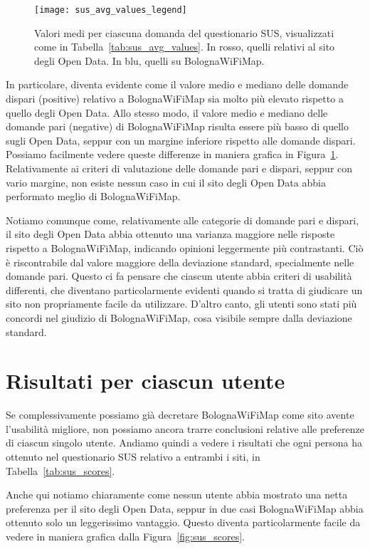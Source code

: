 \begin{figure}[H]
    \centering
    \texttt{[image: sus\_avg\_values\_legend]}
    \caption[Valori medi per ciascuna domanda del questionario SUS]{Valori medi per ciascuna domanda del questionario SUS, visualizzati come in Tabella~\ref{tab:sus_avg_values}. In rosso, quelli relativi al sito degli Open Data. In blu, quelli su BolognaWiFiMap.}
    \label{fig:sus_avg_values}
\end{figure}

In particolare, diventa evidente come il valore medio e mediano delle domande dispari (positive) relativo a BolognaWiFiMap sia molto più elevato rispetto a quello degli Open Data. Allo stesso modo, il valore medio e mediano delle domande pari (negative) di BolognaWiFiMap risulta essere più basso di quello sugli Open Data, seppur con un margine inferiore rispetto alle domande dispari. Possiamo facilmente vedere queste differenze in maniera grafica in Figura~\ref{fig:sus_avg_values}. Relativamente ai criteri di valutazione delle domande pari e dispari, seppur con vario margine, non esiste nessun caso in cui il sito degli Open Data abbia performato meglio di BolognaWiFiMap.

Notiamo comunque come, relativamente alle categorie di domande pari e dispari, il sito degli Open Data abbia ottenuto una varianza maggiore nelle risposte rispetto a BolognaWiFiMap, indicando opinioni leggermente più contrastanti. Ciò è riscontrabile dal valore maggiore della deviazione standard, specialmente nelle domande pari. Questo ci fa pensare che ciascun utente abbia criteri di usabilità differenti, che diventano particolarmente evidenti quando si tratta di giudicare un sito non propriamente facile da utilizzare. D'altro canto, gli utenti sono stati più concordi nel giudizio di BolognaWiFiMap, cosa visibile sempre dalla deviazione standard.

\section{Risultati per ciascun utente}
Se complessivamente possiamo già decretare BolognaWiFiMap come sito avente l'usabilità migliore, non possiamo ancora trarre conclusioni relative alle preferenze di ciascun singolo utente. Andiamo quindi a vedere i risultati che ogni persona ha ottenuto nel questionario SUS relativo a entrambi i siti, in Tabella~\ref{tab:sus_scores}.

Anche qui notiamo chiaramente come nessun utente abbia mostrato una netta preferenza per il sito degli Open Data, seppur in due casi BolognaWiFiMap abbia ottenuto solo un leggerissimo vantaggio. Questo diventa particolarmente facile da vedere in maniera grafica dalla Figura~\ref{fig:sus_scores}.

